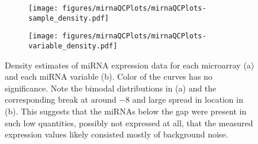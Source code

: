 \begin{figure}[!h]
	\centering
	\begin{subfigure}{.49\textwidth}
		\texttt{[image: figures/mirnaQCPlots/mirnaQCPlots-sample\_density.pdf]}
	\end{subfigure}%
	\begin{subfigure}{.49\textwidth}
		\texttt{[image: figures/mirnaQCPlots/mirnaQCPlots-variable\_density.pdf]}
	\end{subfigure}

	\caption{Density estimates of miRNA expression data for each microarray (a)
	and each miRNA variable (b). Color of the curves has no significance.
	Note the bimodal distributions in (a) and the corresponding break at around $-8$
	and large spread in location in (b). This suggests that the miRNAs below the gap were present in
	such low quantities, possibly not expressed at all, that the measured expression values likely
	consisted mostly of background noise.}
	\label{fig:qc-mirna-density}
\end{figure}
